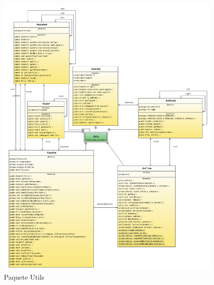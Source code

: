 \documentclass[letterpaper,12pt]{report}
\begin{document}
\begin{figure}
\centering
\includegraphics[width=1.5\textwidth]{Utils.png}
\caption{Paquete Utils}
\end{figure}
\newpage
\end{document}
